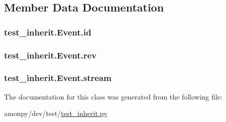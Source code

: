 \subsection{Member Data Documentation}
\hypertarget{classtest__inherit_1_1_event_ad776b91acd2cdadf7e56b0eae0defb55}{
\subsubsection[{id}]{\setlength{\rightskip}{0pt plus 5cm}test\-\_\-inherit.\-Event.\-id}}\label{classtest__inherit_1_1_event_ad776b91acd2cdadf7e56b0eae0defb55}
\hypertarget{classtest__inherit_1_1_event_a3332478f94ada42bc86e88b92bd90da2}{
\subsubsection[{rev}]{\setlength{\rightskip}{0pt plus 5cm}test\-\_\-inherit.\-Event.\-rev}}\label{classtest__inherit_1_1_event_a3332478f94ada42bc86e88b92bd90da2}
\hypertarget{classtest__inherit_1_1_event_a38bfcd2b6a2b6a68b7146c698dd67f7b}{
\subsubsection[{stream}]{\setlength{\rightskip}{0pt plus 5cm}test\-\_\-inherit.\-Event.\-stream}}\label{classtest__inherit_1_1_event_a38bfcd2b6a2b6a68b7146c698dd67f7b}


The documentation for this class was generated from the following file\-:\begin{DoxyCompactItemize}
\item 
amonpy/dev/test/\hyperlink{test__inherit_8py}{test\-\_\-inherit.\-py}\end{DoxyCompactItemize}
